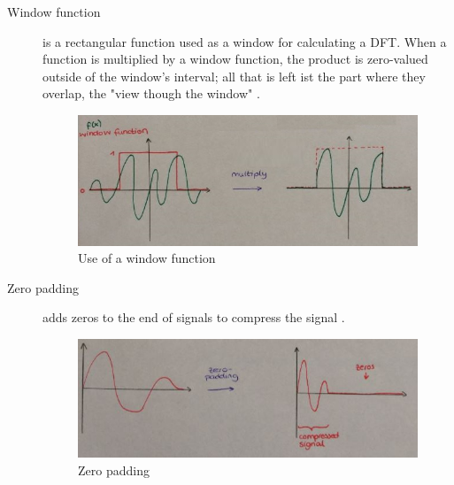 \begin{description}
	\item[Window function] is a rectangular function used as a window for calculating a DFT. When a function is multiplied by a window function, the product is zero-valued outside of the window's interval; all that is left ist the part where they overlap, the "view though the window" .
		\begin{figure}[!h]
			\centering
			\includegraphics[width=0.7\linewidth]{images/window}
			\caption{Use of a window function}
			\label{fig:window}
		\end{figure}
	
	\item[Zero padding] adds zeros to the end of signals to compress the signal .
		\begin{figure}[!h]
			\centering
			\includegraphics[width=0.7\linewidth]{images/zerop}
			\caption{Zero padding}
			\label{fig:zerop}
		\end{figure}


	
\end{description}
